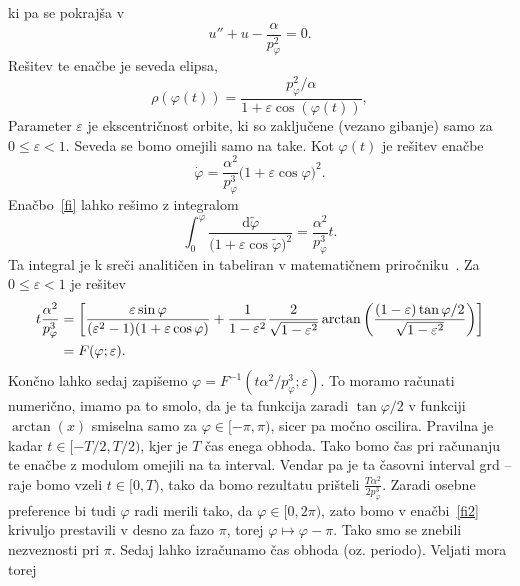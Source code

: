 \documentclass[12pt, a4paper]{article}
\renewcommand{\d}{
    \ensuremath{\mathrm{d}}
}
\begin{document}
ki pa se pokraj\v sa v
\begin{equation}
    u'' + u - \frac{\alpha}{p^2_\varphi} = 0.
\end{equation}
Re\v sitev te ena\v cbe je seveda elipsa,
\begin{equation}
    \rho(\varphi(t)) = \frac{p_\varphi^2/\alpha}{1 + \varepsilon\cos(\varphi(t))},
\end{equation}
Parameter $\varepsilon$ je ekscentri\v cnost orbite, ki so zaklju\v cene (vezano gibanje) samo za
$0 \leq \varepsilon < 1$. Seveda se bomo omejili samo na take.
Kot $\varphi(t)$ je re\v sitev ena\v cbe
\begin{equation}
    \dot{\varphi} = \frac{\alpha^2}{p_\varphi^3}\big(1 + \varepsilon\cos\varphi\big)^2.
    \label{fi}
\end{equation}
Ena\v cbo~\eqref{fi} lahko re\v simo z integralom
\begin{equation}
    \int_0^{\varphi}\frac{\d \tilde{\varphi}}{\big(1 + \varepsilon\cos\tilde{\varphi}\big)^2} = \frac{\alpha^2}{p_\varphi^3}t.
\end{equation}
Ta integral je k sre\v ci analiti\v cen in tabeliran v matemati\v cnem priro\v cniku~\cite{bronstejn}. Za
$0 \leq \varepsilon < 1$ je re\v sitev
\begin{align}
    t\frac{\alpha^2}{p^3_\varphi} &= \bigg[\frac{\varepsilon\sin\varphi}{(\varepsilon^2 - 1)(1 + \varepsilon\cos\varphi)}
            +\frac{1}{1 - \varepsilon^2}\frac{2}{\sqrt{1 - \varepsilon^2}}\arctan\bigg(\frac{(1 - \varepsilon)\tan\varphi/2}
            {\sqrt{1 - \varepsilon^2}}\bigg)\bigg] \notag \\
        &= F(\varphi; \varepsilon).
    \label{fi2}
\end{align}
Kon\v cno lahko sedaj zapi\v semo $\varphi = F^{-1}(t\alpha^2/p^3_\varphi; \varepsilon)$. To moramo ra\v cunati
numeri\v cno, imamo pa to smolo, da je ta funkcija zaradi $\tan\varphi/2$ v funkciji $\arctan(x)$ smiselna samo za
$\varphi \in [-\pi,\pi)$, sicer pa mo\v cno oscilira. Pravilna je kadar $t \in [-T/2, T/2)$, kjer je $T$ \v cas enega
obhoda. Tako bomo \v cas pri ra\v cunanju te ena\v cbe z modulom omejili na ta interval. Vendar pa je ta \v casovni
interval grd -- raje bomo vzeli $t \in [0, T)$, tako da bomo rezultatu pri\v steli $\frac{T\alpha^2}{2p^3_\varphi}$.
Zaradi osebne preference bi tudi $\varphi$ radi merili tako, da $\varphi \in [0, 2\pi)$, zato bomo v ena\v cbi~\eqref{fi2}
krivuljo prestavili v desno za fazo $\pi$, torej $\varphi \mapsto \varphi - \pi$. Tako smo se znebili nezveznosti pri
$\pi$. Sedaj lahko izra\v cunamo \v cas obhoda (oz. periodo). Veljati mora torej
\end{document}
